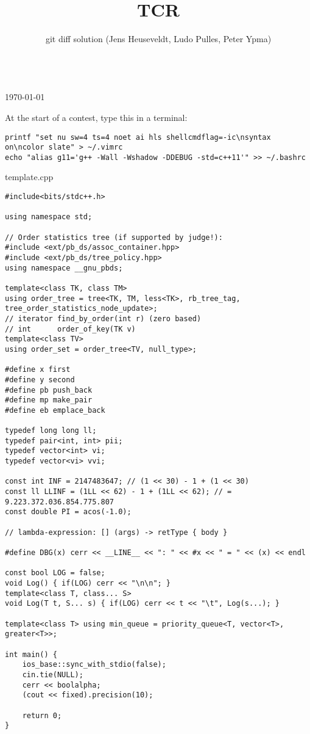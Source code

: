 \documentclass{article}
\title{TCR}
\author{git diff solution (Jens Heuseveldt, Ludo Pulles, Peter Ypma)}
\begin{document}
\maketitle
\begin{center}
	\makeatletter
	\textbf{\@title} \\
	\today \\
	\emph{\@author}
	\makeatother
\end{center}

\tableofcontents

\begin{center}
At the start of a contest, type this in a terminal:
\end{center}

\begin{lstlisting}
printf "set nu sw=4 ts=4 noet ai hls shellcmdflag=-ic\nsyntax on\ncolor slate" > ~/.vimrc
echo "alias g11='g++ -Wall -Wshadow -DDEBUG -std=c++11'" >> ~/.bashrc
\end{lstlisting}

\begin{center}
template.cpp
\end{center}

\begin{lstlisting}
#include<bits/stdc++.h>

using namespace std;

// Order statistics tree (if supported by judge!):
#include <ext/pb_ds/assoc_container.hpp>
#include <ext/pb_ds/tree_policy.hpp>
using namespace __gnu_pbds;

template<class TK, class TM>
using order_tree = tree<TK, TM, less<TK>, rb_tree_tag, tree_order_statistics_node_update>;
// iterator	find_by_order(int r) (zero based)
// int		order_of_key(TK v)
template<class TV>
using order_set = order_tree<TV, null_type>;

#define x first
#define y second
#define pb push_back
#define mp make_pair
#define eb emplace_back

typedef long long ll;
typedef pair<int, int> pii;
typedef vector<int> vi;
typedef vector<vi> vvi;

const int INF = 2147483647; // (1 << 30) - 1 + (1 << 30)
const ll LLINF = (1LL << 62) - 1 + (1LL << 62); // = 9.223.372.036.854.775.807
const double PI = acos(-1.0);

// lambda-expression: [] (args) -> retType { body }

#define DBG(x) cerr << __LINE__ << ": " << #x << " = " << (x) << endl

const bool LOG = false;
void Log() { if(LOG) cerr << "\n\n"; }
template<class T, class... S>
void Log(T t, S... s) { if(LOG) cerr << t << "\t", Log(s...); }

template<class T> using min_queue = priority_queue<T, vector<T>, greater<T>>;

int main() {
	ios_base::sync_with_stdio(false);
	cin.tie(NULL);
	cerr << boolalpha;
	(cout << fixed).precision(10);

	return 0;
}
\end{lstlisting}
\end{document}
